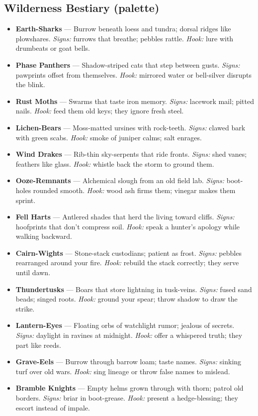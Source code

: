 \subsection*{Wilderness Bestiary (palette)}
\begin{itemize}
  \item \textbf{Earth-Sharks} — Burrow beneath loess and tundra; dorsal ridges like plowshares. \emph{Signs:} furrows that breathe; pebbles rattle. \emph{Hook:} lure with drumbeats or goat bells.
  \item \textbf{Phase Panthers} — Shadow-striped cats that step between gusts. \emph{Signs:} pawprints offset from themselves. \emph{Hook:} mirrored water or bell-silver disrupts the blink.
  \item \textbf{Rust Moths} — Swarms that taste iron memory. \emph{Signs:} lacework mail; pitted nails. \emph{Hook:} feed them old keys; they ignore fresh steel.
  \item \textbf{Lichen-Bears} — Moss-matted ursines with rock-teeth. \emph{Signs:} clawed bark with green scabs. \emph{Hook:} smoke of juniper calms; salt enrages.
  \item \textbf{Wind Drakes} — Rib-thin sky-serpents that ride fronts. \emph{Signs:} shed vanes; feathers like glass. \emph{Hook:} whistle back the storm to ground them.
  \item \textbf{Ooze-Remnants} — Alchemical slough from an old field lab. \emph{Signs:} boot-holes rounded smooth. \emph{Hook:} wood ash firms them; vinegar makes them sprint.
  \item \textbf{Fell Harts} — Antlered shades that herd the living toward cliffs. \emph{Signs:} hoofprints that don’t compress soil. \emph{Hook:} speak a hunter’s apology while walking backward.
  \item \textbf{Cairn-Wights} — Stone-stack custodians; patient as frost. \emph{Signs:} pebbles rearranged around your fire. \emph{Hook:} rebuild the stack correctly; they serve until dawn.
  \item \textbf{Thundertusks} — Boars that store lightning in tusk-veins. \emph{Signs:} fused sand beads; singed roots. \emph{Hook:} ground your spear; throw shadow to draw the strike.
  \item \textbf{Lantern-Eyes} — Floating orbs of watchlight rumor; jealous of secrets. \emph{Signs:} daylight in ravines at midnight. \emph{Hook:} offer a whispered truth; they part like reeds.
  \item \textbf{Grave-Eels} — Burrow through barrow loam; taste names. \emph{Signs:} sinking turf over old wars. \emph{Hook:} sing lineage or throw false names to mislead.
  \item \textbf{Bramble Knights} — Empty helms grown through with thorn; patrol old borders. \emph{Signs:} briar in boot-grease. \emph{Hook:} present a hedge-blessing; they escort instead of impale.
\end{itemize}

